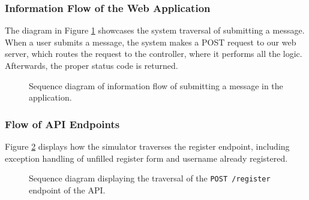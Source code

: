 \documentclass[12pt, a4paper, oneside]{book}
\begin{document}
\subsubsection{Information Flow of the Web Application}
The diagram in Figure \ref{fig:seq-diagram-infoflow} showcases the system traversal of submitting a message.
When a user submits a message, the system makes a POST request to our web server, which routes the request to the controller, where it performs all the logic.
Afterwards, the proper status code is returned.

\begin{figure}[H]
    \centering
    \caption{Sequence diagram of information flow of submitting a message in the application.}
    \label{fig:seq-diagram-infoflow}
\end{figure}

\subsubsection{Flow of API Endpoints}
Figure \ref{fig:seq-diagram-register} displays how the simulator traverses the register endpoint, including exception handling of unfilled register form and username already registered.

\begin{figure}[H]
    \centering
    \caption{Sequence diagram displaying the traversal of the \texttt{POST /register} endpoint of the API.}
    \label{fig:seq-diagram-register}
\end{figure}
\end{document}
